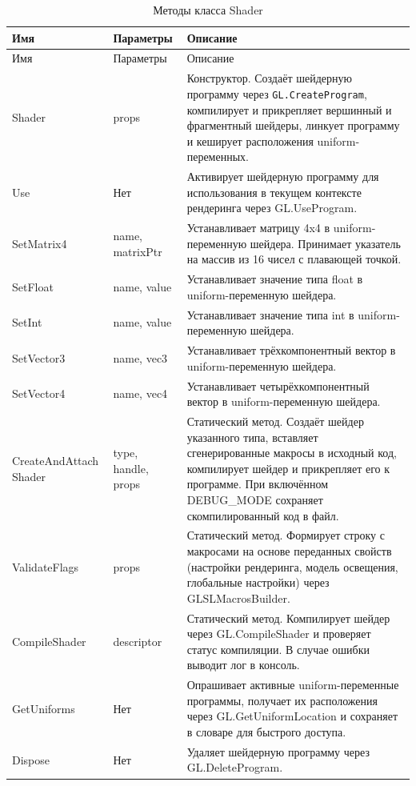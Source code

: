 \begin{xltabular}{\textwidth}{|>{\raggedright\arraybackslash}p{3.5cm}|>{\raggedright\arraybackslash}p{3.5cm}|>{\raggedright\arraybackslash}X|}
	\caption{Методы класса Shader\label{ShaderMethods:table}}\\ \hline
	\centrow Имя & \centrow Параметры & \centrow Описание \\ \hline
	\endfirsthead
	\centrow Имя & \centrow Параметры & \centrow Описание \\ \hline 
	\finishhead
	Shader & props & Конструктор. Создаёт шейдерную программу через \texttt{GL.CreateProgram}, компилирует и прикрепляет вершинный и фрагментный шейдеры, линкует программу и кеширует расположения uniform-переменных. \\
	\hline
	Use & Нет & Активирует шейдерную программу для использования в текущем контексте рендеринга через GL.UseProgram. \\
	\hline
	SetMatrix4 & name, matrixPtr & Устанавливает матрицу 4x4 в uniform-переменную шейдера. Принимает указатель на массив из 16 чисел с плавающей точкой. \\
	\hline
	SetFloat & name, value & Устанавливает значение типа float в uniform-переменную шейдера. \\
	\hline
	SetInt & name, value & Устанавливает значение типа int в uniform-переменную шейдера. \\
	\hline
	SetVector3 & name, vec3 & Устанавливает трёхкомпонентный вектор в uniform-переменную шейдера. \\
	\hline
	SetVector4 & name, vec4 & Устанавливает четырёхкомпонентный вектор в uniform-переменную шейдера. \\
	\hline
	CreateAndAttach
	Shader & type, handle, props & Статический метод. Создаёт шейдер указанного типа, вставляет сгенерированные макросы в исходный код, компилирует шейдер и прикрепляет его к программе. При включённом DEBUG\_MODE сохраняет скомпилированный код в файл. \\
	\hline
	ValidateFlags & props & Статический метод. Формирует строку с макросами на основе переданных свойств (настройки рендеринга, модель освещения, глобальные настройки) через GLSLMacrosBuilder. \\
	\hline
	CompileShader & descriptor & Статический метод. Компилирует шейдер через GL.CompileShader и проверяет статус компиляции. В случае ошибки выводит лог в консоль. \\
	\hline
	GetUniforms & Нет & Опрашивает активные uniform-переменные программы, получает их расположения через GL.GetUniformLocation и сохраняет в словаре для быстрого доступа. \\
	\hline
	Dispose & Нет & Удаляет шейдерную программу через GL.DeleteProgram.
\end{xltabular}


